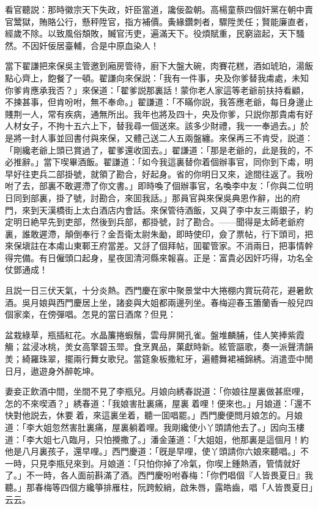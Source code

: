 看官聽説：那時徽宗天下失政，奸臣當道，讒佞盈朝。高楊童蔡四個奸黨在朝中賣官鬵獄，賄賂公行，懸秤陞官，指方補價。夤緣鑽刺者，驟陞羙任；賢能廉直者，經歲不除。以致風俗頽敗，贓官汚吏，遍滿天下。役煩賦重，民窮盜起，天下騷然。不因奸佞居臺輔，合是中原血染人！

當下翟謙把來保吳主管邀到廂房管待，廚下大盤大碗，肉賽花糕，酒如琥珀，湯飯點心齊上，飽餐了一頓。翟謙向來保説：「我有一件事，央及你爹替我䖏處，未知你爹肯應承我否？」來保道：「翟爹説那裏話！蒙你老人家這等老爺前扶持看顧，不揀甚事，但肯吩咐，無不奉命。」翟謙道：「不瞞你説，我答應老爺，每日身邊止賤荆一人，常有疾病，通無所出。我年也將及四十，央及你爹，只説你那貴䖏有好人材女子，不拘十五六上下，替我尋一個送來。該多少財禮，我一一奉過去。」於是將一封人事並回書付與來保，又體己送二人五兩盤纏。來保再三不肯受，説道：「剛纔老爺上頭已賞過了，翟爹還收囬去。」翟謙道：「那是老爺的，此是我的，不必推辭。」當下喫畢酒飯。翟謙道：「如今我這裏替你着個辦事官，同你到下䖏，明早好往吏兵二部掛號，就領了勘合，好起身。省的你明日又來，途間往返了。我吩咐了去，部裏不敢遲滯了你文書。」即時喚了個辦事官，名喚李中友：「你與二位明日同到部裏，掛了號，討勘合，來囬我話。」那員官與來保吳典恩作辭，出的府門，來到天漢橋街上太白酒店内會話。來保管待酒飯，又與了李中友三兩銀子，約定明日絶早先到吏部，然後到兵部，都掛號，討了勘合。——聞得是太師老爺府裏，誰敢遲滯，顛倒奉行？金吾衛太尉朱勔，即時使印，僉了票帖，行下頭司，把來保塡註在本䖏山東鄆王府當差。又㧱了個拜帖，囬翟管家。不消兩日，把事情幹得完備。有日僱頭口起身，星夜囬清河縣來報喜。正是：富貴必因奸巧得，功名全仗鄧通成！

且説一日三伏天氣，十分炎熱。西門慶在家中聚景堂中大捲棚内賞玩荷花，避暑飲酒。吳月娘與西門慶居上坐，諸妾與大姐都兩邊列坐。春梅迎春玉簫蘭香一般兒四個家楽，在傍彈唱。怎見的當日酒席？但見：

\begin{myquote}
盆栽綠草，瓶插紅花。水晶簾捲蝦鬚，雲母屏開孔雀。盤堆麟脯，佳人笑捧紫霞觴；盆浸冰桃，羙女高擎碧玉斝。食烹異品，菓獻時新。絃管謳歌，奏一派聲清韻羙；綺羅珠翠，擺兩行舞女歌兒。當筵象板撒紅牙，遍體舞裙補錦綉。消遣壶中閒日月，遨遊身外醉乾坤。
\end{myquote}

妻妾正飲酒中間，坐間不見了李瓶兒。月娘向綉春説道：「你娘往屋裏做甚麽哩，怎的不來喫酒？」綉春道：「我娘害肚裏痛，屋裏𢱉着哩！便來也。」月娘道：「還不快對他説去，休要𢱉着，來這裏坐着，聽一囬唱罷。」西門慶便問月娘怎的。月娘道：「李大姐忽然害肚裏痛，屋裏躺着哩。我剛纔使小丫頭請他去了。」因向玉樓道：「李大姐七八臨月，只怕攪撒了。」潘金蓮道：「大姐姐，他那裏是這個月！約他是八月裏孩子，還早哩。」西門慶道：「旣是早哩，使丫頭請你六娘來聽唱。」不一時，只見李瓶兒來到。月娘道：「只怕你掉了冷氣，你喫上鍾熱酒，管情就好了。」不一時，各人面前斟滿了酒。西門慶吩咐春梅：「你們唱個『人皆畏夏日』我聽。」那春梅等四個方纔箏排雁柱，阮跨鮫綃，啟朱唇，露皓齒，唱「人皆畏夏日」云云。

